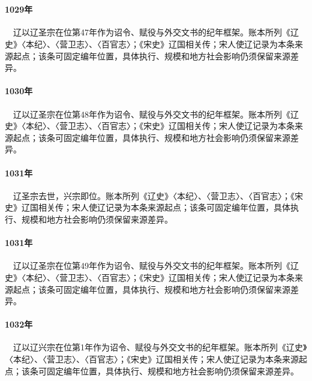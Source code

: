 \section{}

\paragraph{1029年}　辽以辽圣宗在位第47年作为诏令、赋役与外交文书的纪年框架。账本所列《辽史》〈本纪〉、〈营卫志〉、〈百官志〉；《宋史》辽国相关传；宋人使辽记录为本条来源起点；该条可固定编年位置，具体执行、规模和地方社会影响仍须保留来源差异。

\paragraph{1030年}　辽以辽圣宗在位第48年作为诏令、赋役与外交文书的纪年框架。账本所列《辽史》〈本纪〉、〈营卫志〉、〈百官志〉；《宋史》辽国相关传；宋人使辽记录为本条来源起点；该条可固定编年位置，具体执行、规模和地方社会影响仍须保留来源差异。

\paragraph{1031年}　辽圣宗去世，兴宗即位。账本所列《辽史》〈本纪〉、〈营卫志〉、〈百官志〉；《宋史》辽国相关传；宋人使辽记录为本条来源起点；该条可固定编年位置，具体执行、规模和地方社会影响仍须保留来源差异。

\paragraph{1031年}　辽以辽圣宗在位第49年作为诏令、赋役与外交文书的纪年框架。账本所列《辽史》〈本纪〉、〈营卫志〉、〈百官志〉；《宋史》辽国相关传；宋人使辽记录为本条来源起点；该条可固定编年位置，具体执行、规模和地方社会影响仍须保留来源差异。

\paragraph{1032年}　辽以辽兴宗在位第1年作为诏令、赋役与外交文书的纪年框架。账本所列《辽史》〈本纪〉、〈营卫志〉、〈百官志〉；《宋史》辽国相关传；宋人使辽记录为本条来源起点；该条可固定编年位置，具体执行、规模和地方社会影响仍须保留来源差异。

